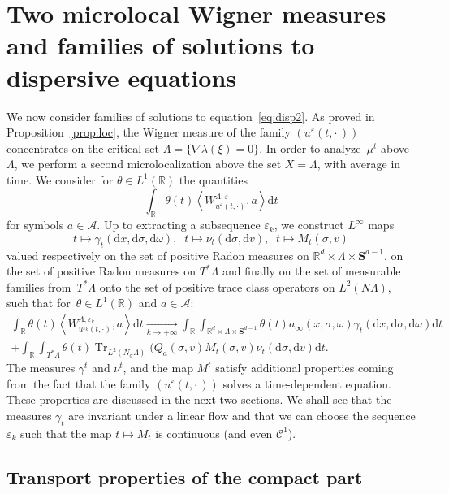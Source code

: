 \documentclass[AHL,Unicode,longabstracts]{cedram}
\DeclareMathOperator{\Trr}{Tr}
\newcommand*\R{{\mathbb R}}
\newcommand*\eps{\varepsilon}
\numberwithin{equation}{section}
\def\Tend#1#2{\mathop{\longrightarrow}\limits_{#1\rightarrow#2}}
\newcommand*{\dd}{\mathrm{d}}
\newcommand*{\dt}{\dd t}
\newcommand*{\dx}{\dd x}
\newcommand*{\dv}{\dd v}
\newcommand*{\dsigma}{\dd \sigma}
\newcommand*{\domega}{\dd \omega}
\begin{document}
\section{Two microlocal Wigner measures and families of solutions to dispersive equations}\label{sec:4}

We now consider families of solutions to equation~\eqref{eq:disp2}. As proved in Proposition~\ref{prop:loc}, the Wigner measure of the family $(u^\eps(t,\cdot\,))$ concentrates on the critical set $\Lambda=\{\nabla\lambda(\xi)=0\}.$ In order to analyze~$\mu^t$ above $\Lambda$, we perform a second microlocalization above the set $X=\Lambda$, with average in time. We consider for $\theta\in L^1(\R)$ the quantities
\[
\int_\R \theta(t) \left\langle W^{\Lambda,\eps}_{u^\eps(t,\cdot)},a\right\rangle \dt
\]
for symbols $a\in{\mathcal A}$. Up to extracting a subsequence $\eps_k$, we construct $L^\infty$ maps
\[
t\mapsto \gamma_t(\dx,\dsigma,\domega),\;\; t\mapsto \nu_t(\dsigma,\dv),\;\; t\mapsto M_t(\sigma,v)
\]
valued respectively on the set of positive Radon measures on $\R^d\times\Lambda\times \mathbf{S}^{d-1}$, on the set of positive Radon measures on $T^*\Lambda$ and finally on the set of measurable families from~$T^*\Lambda$ onto the set of positive trace class operators on $L^2(N\Lambda)$, such that for~$\theta\in L^1(\R)$ and $a\in{\mathcal A}$:
\begin{multline*}
\int_\R \theta(t) \left\langle W^{\Lambda,\eps_k}_{u^{\eps_k}(t,\cdot)},a\right\rangle \dt\Tend{k}{+\infty}
\int_\R \int _{\R^d\times \Lambda\times \mathbf{S}^{d-1}} \theta(t)a_\infty (x,\sigma,\omega) \gamma_t(\dx,\dsigma,\domega) \dt\\
+\int_\R \int_{T^*\Lambda}\theta(t) {\Trr}_{L^2(N_\sigma\Lambda)} (Q_a(\sigma,v)M_t(\sigma,v)\nu_t(\dsigma,\dv)\dt.
\end{multline*}
The measures $\gamma^t$ and $\nu^t$, and the map $M^t$ satisfy additional properties coming from the fact that the family $(u^\eps(t,\cdot\,))$ solves a time-dependent equation. These properties are discussed in the next two sections. We shall see that the measures $\gamma_t$ are invariant under a linear flow and that we can choose the sequence $\eps_k$ such that the map $t\mapsto M_t$ is continuous (and even ${\mathcal C}^1$).



\subsection{Transport properties of the compact part}
\end{document}
